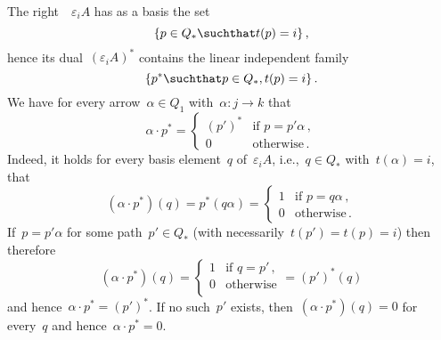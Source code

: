 \begin{remark*}
\begin{enumerate}
      The right~{}~$\varepsilon_i A$ has as a basis the set
      \begin{equation}
        \label{original basis}
        \{
          p \in Q_*
        \suchthat
          t(p) = i
        \}  \,,
      \end{equation}
      hence its dual~$(\varepsilon_i A)^*$ contains the linear independent family
      \begin{equation}
        \label{dual basis}
        \{
          p^*
        \suchthat
          p \in Q_*,
          t(p) = i
        \}  \,.
      \end{equation}
      We have for every arrow~$\alpha \in Q_1$ with~$\alpha \colon j \to k$ that
      \begin{equation}
        \label{dual multiplication rule}
        \alpha \cdot p^*
        =
        \begin{cases}
          (p')^*  & \text{if~$p = p' \alpha$}  \,, \\
          0       & \text{otherwise}  \,.
        \end{cases}
      \end{equation}
      Indeed, it holds for every basis element~$q$ of~$\varepsilon_i A$, i.e.,~$q \in Q_*$ with~$t(\alpha) = i$, that
      \[
        (\alpha \cdot p^*)(q)
        =
        p^*(q \alpha)
        =
        \begin{cases}
          1 & \text{if~$p = q \alpha$}  \,, \\
          0 & \text{otherwise}  \,.
        \end{cases}
      \]
      If~$p = p' \alpha$ for some path~$p' \in Q_*$ (with necessarily~$t(p') = t(p) = i$) then therefore
      \[
        (\alpha \cdot p^*)(q)
        =
        \begin{cases}
          1 & \text{if~$q = p'$}  \,, \\
          0 & \text{otherwise}        \\
        \end{cases}
        =
        (p')^*(q)
      \]
      and hence~$\alpha \cdot p^* = (p')^*$.
      If no such~$p'$ exists, then~$(\alpha \cdot p^*)(q) = 0$ for every~$q$ and hence~$\alpha \cdot p^* = 0$.
      

\end{enumerate}
\end{remark*}
